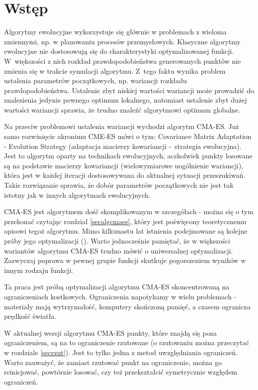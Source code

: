 \documentclass{mini}
\begin{document}
\pagebreak

\section{Wstęp}
Algorytmy ewolucyjne wykorzystuje się głównie w problemach z wieloma zmiennymi, np. w planowaniu procesów przemysłowych.\cite{zast} Klasyczne algorytmy ewolucyjne nie dostosowują się do charakterystyki optymalizowanej funkcji. W~większości z nich rozkład prawdopodobieństwa generowanych punktów nie zmienia się w trakcie symulacji algorytmu. Z~tego faktu wynika problem ustalenia parametrów początkowych, np. wariancji rozkładu prawdopodobieństwa. Ustalenie zbyt niskiej wartości wariancji może prowadzić do znalezienia jedynie pewnego optimum lokalnego, natomiast ustalenie zbyt dużej wartości wariancji sprawia, że trudno znaleźć algorytmowi optimum globalne.

Na przeciw problemowi ustalenia wariancji wychodzi algorytm CMA-ES. Już samo rozwinięcie akronimu CME-ES mówi o tym: Covariance Matrix Adaptation - Evolution Strategy (adaptacja macierzy kowariancji -~strategia ewolucyjna). Jest to algorytm oparty na technikach ewolucyjnych, aczkolwiek punkty losowane są na podstawie macierzy kowariancji (wielowymiarowe uogólnienie wariancji), która jest w każdej iteracji dostosowywana do aktualnej sytuacji przeszukiwań. Takie rozwiązanie sprawia, że dobór parametrów początkowych nie jest tak istotny jak w innych algorytmach ewolucyjnych.

CMA-ES jest algorytmem dość skomplikowanym w szczegółach - można się o tym przekonać czytając rozdział \ref{secalgcmaes}, który jest poświęcony teoretycznemu opisowi tegoż algorytmu. Mimo kilkunastu lat istnienia podejmowane są kolejne próby jego optymalizacji (\cite{magist}\cite{lcmaes}). Warto jednocześnie pamiętać, że w większości wariantów algorytmu CMA-ES trudno mówić o uniwersalnej optymalizacji. Zazwyczaj poprawa w pewnej grupie funkcji skutkuje pogorszeniem wyników w innym rodzaju funkcji.

Ta praca jest próbą optymalizacji algorytmu CMA-ES skoncentrowaną na ograniczeniach kostkowych. Ograniczenia napotykamy w wielu problemach - materiały mają wytrzymałość, komputery skończoną pamięć, a czasem ogranicza prędkość światła.

W aktualnej wersji algorytmu CMA-ES punkty, które znajdą się poza ograniczeniem, są na to ograniczenie rzutowane (o rzutowaniu można przeczytać w rozdziale \ref{secrzut}). Jest to tylko jedna z metod uwzględniania ograniczeń. Warto zauważyć, że zamiast rzutować punkt na ograniczenie, można go reinicjować, powtórnie losować, czy też przekształcić symetrycznie względem ograniczeń.
\end{document}

